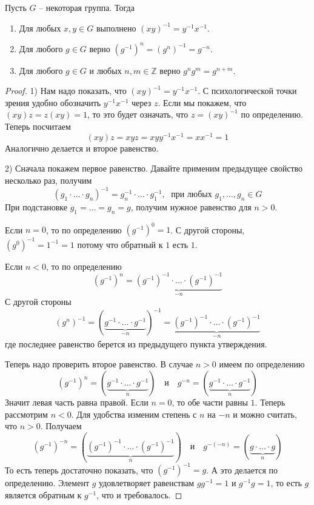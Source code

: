 \begin{claim}
Пусть $G$ -- некоторая группа.
Тогда
\begin{enumerate}
\item Для любых $x,y\in G$ выполнено $(xy)^{-1} = y^{-1}x^{-1}$.

\item Для любого $g\in G$ верно $(g^{-1})^n = (g^n)^{-1} = g^{-n}$.

\item Для любого $g\in G$ и любых $n,m\in \mathbb Z$ верно $g^n g^m = g^{n+m}$.
\end{enumerate}
\end{claim}
\begin{proof}
1) Нам надо показать, что $(xy)^{-1} = y^{-1}x^{-1}$.
С психологической точки зрения удобно обозначить $ y^{-1}x^{-1}$ через $z$.
Если мы покажем, что $(xy)z = z(xy) = 1$, то это будет означать, что $z = (xy)^{-1}$ по определению.
Теперь посчитаем
\[
(xy) z = xy z = xy y^{-1}x^{-1} = x x^{-1} = 1
\]
Аналогично делается и второе равенство.

2) Сначала покажем первое равенство.
Давайте применим предыдущее свойство несколько раз, получим
\[
(g_1\cdot \ldots \cdot g_n)^{-1} = g_n^{-1}\cdot\ldots\cdot g_1^{-1},\;\text{ при любых }g_1,\ldots,g_n\in G
\]
При подстановке $g_1 =\ldots = g_n = g$, получим нужное равенство для $n > 0$.

Если $n = 0$, то по определению $(g^{-1})^0 = 1$.
С другой стороны, $(g^0)^{-1} = 1^{-1} = 1$ потому что обратный к $1$ есть $1$.

Если $n < 0$, то по определению
\[
(g^{-1})^n = \underbrace{(g^{-1})^{-1}\cdot\ldots \cdot (g^{-1})^{-1}}_{-n}
\]
С другой стороны
\[
(g^n)^{-1} = (\underbrace{g^{-1}\cdot \ldots \cdot g^{-1}}_{-n})^{-1} = \underbrace{(g^{-1})^{-1}\cdot\ldots \cdot (g^{-1})^{-1}}_{-n}
\]
где последнее равенство берется из предыдущего пункта утверждения.

Теперь надо проверить второе равенство.
В случае $n > 0$ имеем по определению
\[
(g^{-1})^{n} =  (\underbrace{g^{-1}\cdot \ldots \cdot g^{-1}}_{n})\quad \text{и}\quad
g^{-n} =  (\underbrace{g^{-1}\cdot \ldots \cdot g^{-1}}_{n})
\]
Значит левая часть равна правой.
Если $n = 0$, то обе части равны $1$.
Теперь рассмотрим $n < 0$.
Для удобства изменим степень с $n$ на $-n$ и можно считать, что $n > 0$.
Получаем
\[
(g^{-1})^{-n} =  (\underbrace{(g^{-1})^{-1}\cdot \ldots \cdot (g^{-1})^{-1}}_{n})\quad \text{и}\quad
g^{-(-n)} =  (\underbrace{g\cdot \ldots \cdot g}_{n})
\]
То есть теперь достаточно показать, что $(g^{-1})^{-1} = g$.
А это делается по определению.
Элемент $g$ удовлетворяет равенствам $g g^{-1} = 1$ и $g^{-1} g = 1$, то есть $g$ является обратным к $g^{-1}$, что и требовалось.


\end{proof}
